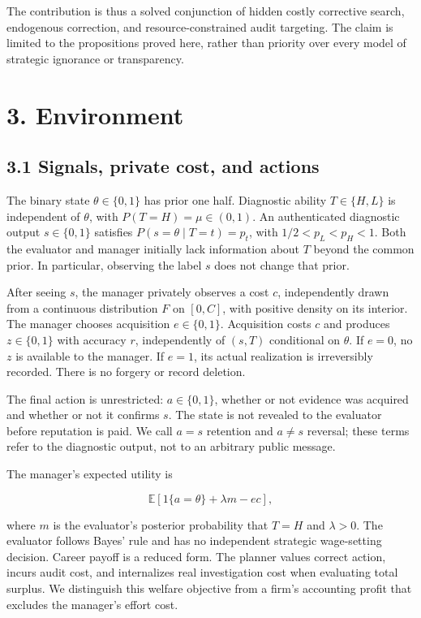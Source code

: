 \documentclass[
  11pt,
]{article}
\begin{document}
The contribution is thus a solved conjunction of hidden costly
corrective search, endogenous correction, and resource-constrained audit
targeting. The claim is limited to the propositions proved here, rather
than priority over every model of strategic ignorance or transparency.

\section{3. Environment}\label{environment}

\subsection{3.1 Signals, private cost, and
actions}\label{signals-private-cost-and-actions}

The binary state \(\theta\in\{0,1\}\) has prior one half. Diagnostic
ability \(T\in\{H,L\}\) is independent of \(\theta\), with
\(P(T=H)=\mu\in(0,1)\). An authenticated diagnostic output
\(s\in\{0,1\}\) satisfies \(P(s=\theta\mid T=t)=p_t\), with
\(1/2<p_L<p_H<1\). Both the evaluator and manager initially lack
information about \(T\) beyond the common prior. In particular,
observing the label \(s\) does not change that prior.

After seeing \(s\), the manager privately observes a cost \(c\),
independently drawn from a continuous distribution \(F\) on \([0,C]\),
with positive density on its interior. The manager chooses acquisition
\(e\in\{0,1\}\). Acquisition costs \(c\) and produces \(z\in\{0,1\}\)
with accuracy \(r\), independently of \((s,T)\) conditional on
\(\theta\). If \(e=0\), no \(z\) is available to the manager. If
\(e=1\), its actual realization is irreversibly recorded. There is no
forgery or record deletion.

The final action is unrestricted: \(a\in\{0,1\}\), whether or not
evidence was acquired and whether or not it confirms \(s\). The state is
not revealed to the evaluator before reputation is paid. We call \(a=s\)
retention and \(a\ne s\) reversal; these terms refer to the diagnostic
output, not to an arbitrary public message.

The manager's expected utility is

\[\mathbb E[1\{a=\theta\}+\lambda m-ec],\tag{1}\]

where \(m\) is the evaluator's posterior probability that \(T=H\) and
\(\lambda>0\). The evaluator follows Bayes' rule and has no independent
strategic wage-setting decision. Career payoff is a reduced form. The
planner values correct action, incurs audit cost, and internalizes real
investigation cost when evaluating total surplus. We distinguish this
welfare objective from a firm's accounting profit that excludes the
manager's effort cost.
\end{document}

